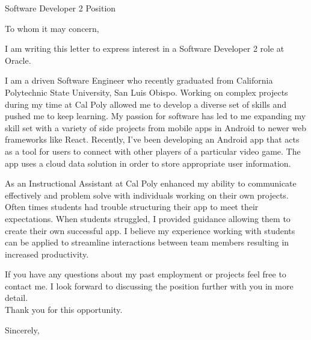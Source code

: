 \documentclass[]{letter}
\makeatletter
\newcommand{\role}{Software Developer 2 }
\newcommand{\company}{Oracle}
\newcommand{\roleAt}{\role role at \company}
\newcommand{\university}{California Polytechnic State University, San Luis Obispo}
\newcommand{\email}{griffinpjohnson@gmail.com}
\newcommand{\phoneNum}{(425) 417 - 5098 }
\newcommand{\myname}{Griffin Johnson}
\makeatother
\begin{document}

\begin{letter}
{
	\role Position
}

\address
{
	\myname \\
	1200 Oceanaire Dr Apt B \\
	San Luis Obispo, CA 93405 \\
	\email \\
	\phoneNum
}

\opening{To whom it may concern,}

I am writing this letter to express interest in a \roleAt.

I am a driven Software Engineer who recently graduated from \university. Working on complex projects during my time at Cal Poly allowed me to develop a diverse set of skills and pushed me to keep learning. My passion for software has led to me expanding my skill set with a variety of side projects from mobile apps in Android to newer web frameworks like React. Recently, I've been developing an Android app that acts as a tool for users to connect with other players of a particular video game. The app uses a cloud data solution in order to store appropriate user information.


As an Instructional Assistant at Cal Poly enhanced my ability to communicate effectively and problem solve with individuals working on their own projects. Often times students had trouble structuring their app to meet their expectations. When students struggled, I provided guidance allowing them to create their own successful app. I believe my experience working with students can be applied to streamline interactions between team members resulting in increased productivity. 

If you have any questions about my past employment or projects feel free to contact me. I look forward to discussing the position further with you in more detail.  \\

Thank you for this opportunity.

\signature
{ 
	\myname
}


\closing
{
	Sincerely,
}


\end{letter}
\end{document}
